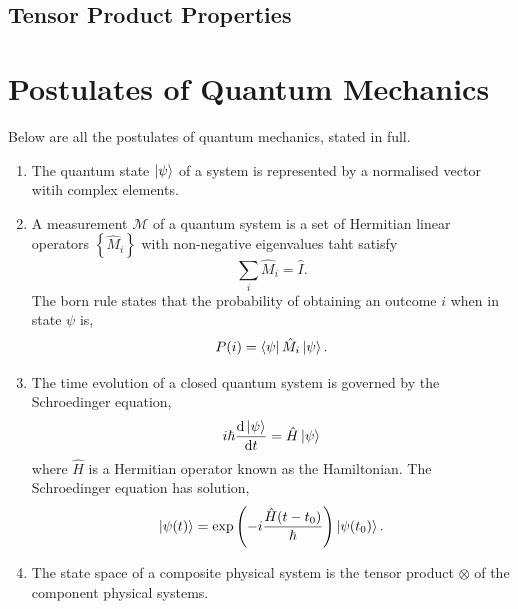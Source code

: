 \documentclass{book}
\begin{document}
\section{Tensor Product Properties} \label{sec:tensor product}
\chapter{Postulates of Quantum Mechanics}
Below are all the postulates of quantum mechanics, stated in full.
\begin{enumerate}
	\item The quantum state $\ket{\psi}$ of a system is represented by a normalised vector witih complex elements.
	\item A measurement $\mathcal{M}$ of a quantum system is a set of Hermitian linear operators $\left\{\hat{M}_i\right\}$ with non-negative eigenvalues taht satisfy
	\begin{equation}
		\sum_i \hat{M}_i = \hat{I}.
	\end{equation}
	The born rule states that the probability of obtaining an outcome $i$ when in state $\psi$ is,
	\begin{equation}
		P(i) = \bra{\psi}\hat{M}_i\ket{\psi}.
	\end{equation}
	\item The time evolution of a closed quantum system is governed by the Schroedinger equation,
	\begin{equation}
		i\hbar \dv{\ket{\psi}}{t} = \hat{H}\ket{\psi}
	\end{equation}
	where $\hat{H}$ is a Hermitian operator known as the Hamiltonian. The Schroedinger equation has solution,
	\begin{equation}
		\ket{\psi(t)} = \exp\left(-i\frac{\hat{H}(t-t_0)}{\hbar}\right)\ket{\psi(t_0)}.
	\end{equation}
	\item The state space of a composite physical system is the tensor product $\otimes$ of the component physical systems.
\end{enumerate}
\end{document}
